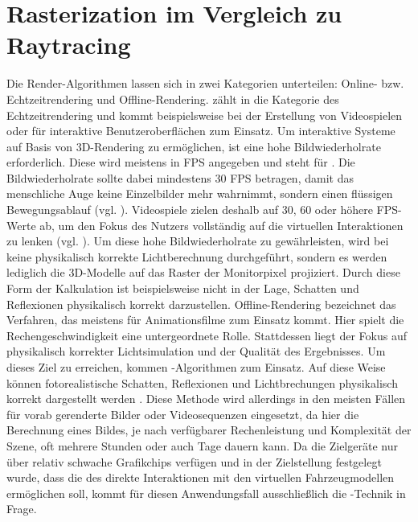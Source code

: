 	\section{Rasterization im Vergleich zu Raytracing}
	\label{sec:rzvsrt}
	Die Render-Algorithmen lassen sich in zwei Kategorien unterteilen: Online- bzw. Echtzeitrendering und Offline-Rendering.  zählt in die Kategorie des Echtzeitrendering und kommt beispielsweise bei der Erstellung von Videospielen oder für interaktive Benutzeroberflächen zum Einsatz. Um interaktive Systeme auf Basis von 3D-Rendering zu ermöglichen, ist eine hohe Bildwiederholrate erforderlich. Diese wird meistens in \acs{FPS} angegeben und steht für  . Die Bildwiederholrate sollte dabei mindestens 30 \acs{FPS} betragen, damit das menschliche Auge keine Einzelbilder mehr wahrnimmt, sondern einen flüssigen Bewegungsablauf (vgl. \cite{Teo.15.10.2010}). Videospiele zielen deshalb auf 30, 60 oder höhere \acs{FPS}-Werte ab, um den Fokus des Nutzers vollständig auf die virtuellen Interaktionen zu lenken (vgl. \cite[S.1]{AkenineMoller.2018}). Um diese hohe Bildwiederholrate zu gewährleisten, wird bei  keine physikalisch korrekte Lichtberechnung durchgeführt, sondern es werden lediglich die 3D-Modelle auf das Raster der Monitorpixel projiziert. Durch diese Form der Kalkulation ist  beispielsweise nicht in der Lage, Schatten und Reflexionen physikalisch korrekt darzustellen. Offline-Rendering bezeichnet das Verfahren, das meistens für Animationsfilme zum Einsatz kommt. Hier spielt die Rechengeschwindigkeit eine untergeordnete Rolle. Stattdessen liegt der Fokus auf physikalisch korrekter Lichtsimulation und der Qualität des Ergebnisses. Um dieses Ziel zu erreichen, kommen -Algorithmen zum Einsatz. Auf diese Weise können fotorealistische Schatten, Reflexionen und Lichtbrechungen physikalisch korrekt dargestellt werden \cite{Whitted.1980}. Diese Methode wird allerdings in den meisten Fällen für vorab gerenderte Bilder oder Videosequenzen eingesetzt, da hier die Berechnung eines Bildes, je nach verfügbarer Rechenleistung und Komplexität der Szene, oft mehrere Stunden oder auch Tage dauern kann. Da die Zielgeräte nur über relativ schwache Grafikchips verfügen und in der Zielstellung festgelegt wurde, dass die \mapp des \vmds direkte Interaktionen mit den virtuellen Fahrzeugmodellen ermöglichen soll, kommt für diesen Anwendungsfall ausschließlich die -Technik in Frage.
	\newpage
